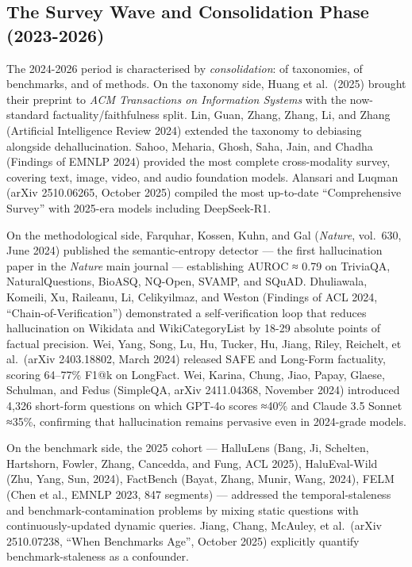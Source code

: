 \subsection{The Survey Wave and Consolidation Phase (2023-2026)}\label{the-survey-wave-and-consolidation-phase-2023-2026}

The 2024-2026 period is characterised by \emph{consolidation}: of taxonomies, of benchmarks, and of methods. On the taxonomy side, Huang et al.~(2025) brought their preprint to \emph{ACM Transactions on Information Systems} with the now-standard factuality/faithfulness split. Lin, Guan, Zhang, Zhang, Li, and Zhang (Artificial Intelligence Review 2024) extended the taxonomy to debiasing alongside dehallucination. Sahoo, Meharia, Ghosh, Saha, Jain, and Chadha (Findings of EMNLP 2024) provided the most complete cross-modality survey, covering text, image, video, and audio foundation models. Alansari and Luqman (arXiv 2510.06265, October 2025) compiled the most up-to-date ``Comprehensive Survey'' with 2025-era models including DeepSeek-R1.

On the methodological side, Farquhar, Kossen, Kuhn, and Gal (\emph{Nature}, vol.~630, June 2024) published the semantic-entropy detector --- the first hallucination paper in the \emph{Nature} main journal --- establishing AUROC ≈ 0.79 on TriviaQA, NaturalQuestions, BioASQ, NQ-Open, SVAMP, and SQuAD. Dhuliawala, Komeili, Xu, Raileanu, Li, Celikyilmaz, and Weston (Findings of ACL 2024, ``Chain-of-Verification'') demonstrated a self-verification loop that reduces hallucination on Wikidata and WikiCategoryList by 18-29 absolute points of factual precision. Wei, Yang, Song, Lu, Hu, Tucker, Hu, Jiang, Riley, Reichelt, et al.~(arXiv 2403.18802, March 2024) released SAFE and Long-Form factuality, scoring 64--77\% F1@k on LongFact. Wei, Karina, Chung, Jiao, Papay, Glaese, Schulman, and Fedus (SimpleQA, arXiv 2411.04368, November 2024) introduced 4,326 short-form questions on which GPT-4o scores ≈40\% and Claude 3.5 Sonnet ≈35\%, confirming that hallucination remains pervasive even in 2024-grade models.

On the benchmark side, the 2025 cohort --- HalluLens (Bang, Ji, Schelten, Hartshorn, Fowler, Zhang, Cancedda, and Fung, ACL 2025), HaluEval-Wild (Zhu, Yang, Sun, 2024), FactBench (Bayat, Zhang, Munir, Wang, 2024), FELM (Chen et al., EMNLP 2023, 847 segments) --- addressed the temporal-staleness and benchmark-contamination problems by mixing static questions with continuously-updated dynamic queries. Jiang, Chang, McAuley, et al.~(arXiv 2510.07238, ``When Benchmarks Age'', October 2025) explicitly quantify benchmark-staleness as a confounder.

